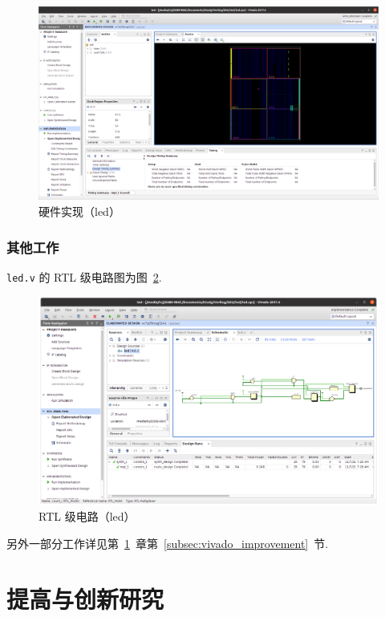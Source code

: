 \documentclass[fontset=windows,11pt]{SEU-Digital-Report}
\begin{document}
                \begin{figure}[h!]
                    \includegraphics[width=\linewidth]{fig/implementation.png}
                    \caption{硬件实现（led）}
                    \label{fig:implementation}
                \end{figure}

            \subsubsection{其他工作}

                \texttt{led.v} 的 RTL 级电路图为图~\ref{fig:RTL_led}.

                \begin{figure}[htbp]
                    \centering
                    \includegraphics[width=.75\linewidth]{fig/RTL_led.png}
                    \caption{RTL 级电路（led）}
                    \label{fig:RTL_led}
                \end{figure}

                另外一部分工作详见第~\ref{sec:improvenment}~章第~\ref{subsec:vivado_improvement}~节.

    \section{提高与创新研究}\label{sec:improvenment}
\end{document}
